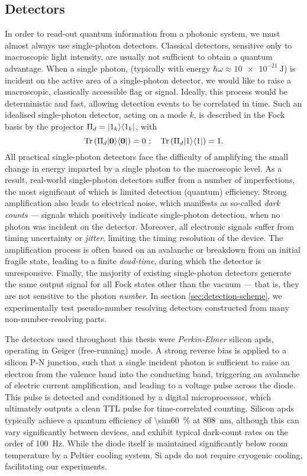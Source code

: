 \subsection{Detectors} 
\label{sec:detectors}
In order to read-out quantum information from a photonic system, we must almost always use single-photon detectors. Classical detectors, sensitive only to macroscopic light intensity, are usually not sufficient to obtain a quantum advantage. When a single photon, (typically with energy $\hbar \omega \approx \SI{10e-21}{\joule}$) is incident on the active area of a single-photon detector, we would like to raise a macroscopic, classically accessible flag or signal. Ideally, this process would be deterministic and fast, allowing detection events to be correlated in time. Such an idealised single-photon detector, acting on a mode $k$, is described in the Fock basis by the projector $\Pi_d = \mbox{$ | 1_k \rangle $}\mbox{$ \langle 1_k | $}$, with
\begin{equation}
    \mathrm{Tr} \left( \Pi_d \mbox{$ | \mathbf{0} \rangle $} \mbox{$ \langle \mathbf{0} | $}\right) = 0 ~;\quad \mathrm{Tr} \left( \Pi_d \mbox{$ | 1 \rangle $} \mbox{$ \langle 1 | $} \right) = 1.
\end{equation}
All practical single-photon detectors face the difficulty of amplifying the small change in energy imparted by a single photon to the macroscopic level. As a result, real-world single-photon detectors suffer from a number of imperfections, the most significant of which is limited detection (quantum) efficiency. Strong amplification also leads to electrical noise, which manifests as so-called \emph{dark counts} --- signals which positively indicate single-photon detection, when no photon was incident on the detector. Moreover, all electronic signals suffer from timing uncertainty or \emph{jitter}, limiting the timing resolution of the device. The amplification process is often based on an avalanche or breakdown from an initial fragile state, leading to a finite \emph{dead-time}, during which the detector is unresponsive. Finally, the majority of existing single-photon detectors generate the same output signal for all Fock states other than the vacuum --- that is, they are not sensitive to the photon \emph{number}. In section \ref{sec:detection-scheme}, we experimentally test pseudo-number resolving detectors constructed from many non-number-resolving parts.

The detectors used throughout this thesis were \emph{Perkin-Elmer} silicon \glspl{apd}, operating in Geiger (free-running) mode. A strong reverse bias is applied to a silicon P-N junction, such that a single incident photon is sufficient to raise an electron from the valence band into the conducting band, triggering an avalanche of electric current amplification, and leading to a voltage pulse across the diode. This pulse is detected and conditioned by a digital microprocessor, which ultimately outputs a clean TTL pulse for time-correlated counting. Silicon \glspl{apd} typically achieve a quantum efficiency of \SI{\sim60}{\percent} at \SI{808}{\nano \metre}, although this can vary significantly between devices, and exhibit typical dark-count rates on the order of \SI{100}{\hertz}. While the diode itself is maintained significantly below room temperature by a Peltier cooling system, Si \glspl{apd} do not require cryogenic cooling, facilitating our experiments. 

